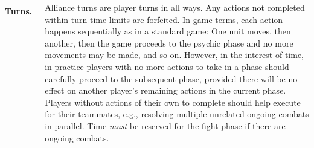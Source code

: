 \begin{columns}
\paragraph{Turns.}  Alliance turns are player turns in all ways.  Any
actions not completed within turn time limits are forfeited.  In game
terms, each action happens sequentially as in a standard game: One
unit moves, then another, then the game proceeds to the psychic phase
and no more movements may be made, and so on.  However, in the
interest of time, in practice players with no more actions to take in
a phase should carefully proceed to the subsequent phase, provided
there will be no effect on another player's remaining actions in the
current phase.  Players without actions of their own to complete
should help execute for their teammates, e.g., resolving multiple
unrelated ongoing combats in parallel.  Time \emph{must} be reserved
for the fight phase if there are ongoing combats.





\end{columns}
